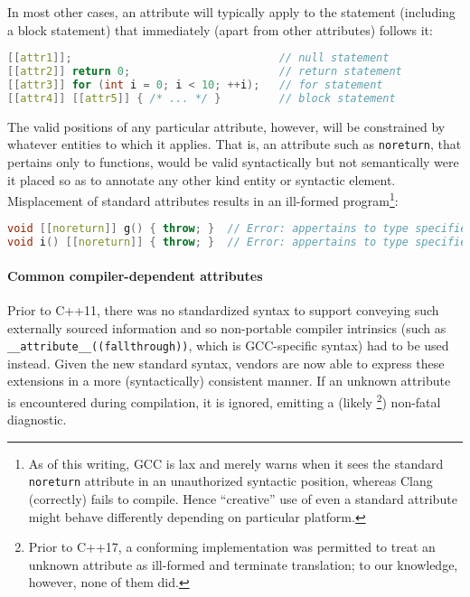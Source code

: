 \documentclass[twoside,10pt,letterpaper,usenames]{newstyle-PearsonGeneric-7-38}
\begin{document}
In most other cases, an attribute will typically apply to the statement
(including a block statement) that immediately (apart from other
attributes) follows it:

\begin{lstlisting}[language=C++]
[[attr1]];                                // null statement
[[attr2]] return 0;                       // return statement
[[attr3]] for (int i = 0; i < 10; ++i);   // for statement
[[attr4]] [[attr5]] { /* ... */ }         // block statement
\end{lstlisting}
    

The valid positions of any particular attribute, however, will be
constrained by whatever entities to which it applies. That is, an
attribute such as \texttt{noreturn}, that pertains only to functions,
would be valid syntactically but not semantically were it placed so as
to annotate any other kind entity or syntactic element. Misplacement of
standard attributes results in an ill-formed
program{\cprotect\footnote{As of this writing, GCC is lax and merely
  warns when it sees the standard \texttt{noreturn} attribute in an
  unauthorized syntactic position, whereas Clang (correctly) fails to
  compile. Hence ``creative'' use of even a standard attribute might
  behave differently depending on particular platform.}}:

\begin{lstlisting}[language=C++]
void [[noreturn]] g() { throw; }  // Error: appertains to type specifier
void i() [[noreturn]] { throw; }  // Error: appertains to type specifier
\end{lstlisting}
    

\paragraph[Common compiler-dependent attributes]{Common compiler-dependent attributes}\label{common-compiler-dependent-attributes}

Prior to C++11, there was no standardized syntax to support conveying
such externally sourced information and so non-portable compiler
intrinsics (such as \texttt{\_\_attribute\_\_((fallthrough))}, which is
GCC-specific syntax) had to be used instead. Given the new standard
syntax, vendors are now able to express these extensions in a more
(syntactically) consistent manner. If an unknown attribute is
encountered during compilation, it is ignored, emitting a (likely
{\cprotect\footnote{Prior to C++17, a conforming implementation was
  permitted to treat an unknown attribute as ill-formed and terminate
  translation; to our knowledge, however, none of them did.}}) non-fatal
diagnostic.
\end{document}
